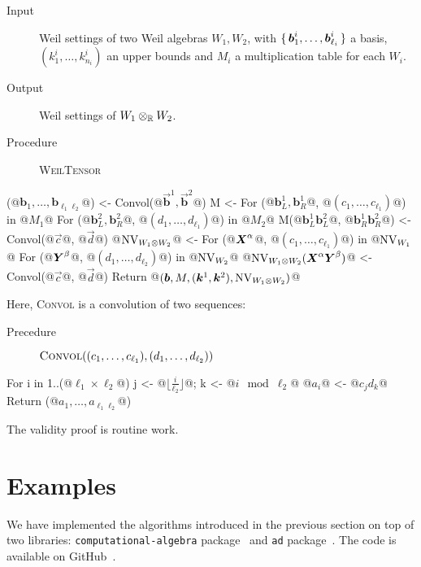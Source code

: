 \begin{algorithm}[WeilTensor]\label{alg:weil-tensor}
\hfill\vspace{-.25em}
\begin{description}
  \item[Input] Weil settings of two Weil algebras $W_1, W_2$,
  with $\set{\boldsymbol{b}_1^i, \dots, \boldsymbol{b}_{\ell_i}^i}$ a basis,
  $(k^i_1, \dots, k^i_{n_i})$ an upper bounds and $M_i$ a multiplication table for each $W_i$.
  \item[Output] Weil settings of $W_1 \otimes_{\mathbb{R}} W_2$.
  \item[Procedure] {\upshape \textsc{WeilTensor}}
\end{description}
\begin{alg}
(@$\boldsymbol{b}_1, \dots, \boldsymbol{b}_{\ell_1 \ell_2}$@) <- Convol(@$\vec{\boldsymbol{b}}^1, \vec{\boldsymbol{b}}^2$@)
M <- {}
For ({@$\boldsymbol{b}^1_L, \boldsymbol{b}^1_R$@}, @$(c_1,\dots,c_{\ell_1})$@) in @$M_1$@
  For ({@$\boldsymbol{b}^2_L, \boldsymbol{b}^2_R$@}, @$(d_1,\dots,d_{\ell_1})$@) in @$M_2$@
    M({@$\boldsymbol{b}^1_L \boldsymbol{b}^2_L$@, @$\boldsymbol{b}^1_R \boldsymbol{b}^2_R$@}) <- Convol(@$\vec{c}$@, @$\vec{d}$@)
@$\operatorname{NV}_{W_1 \otimes W_2}$@ <- {}
For (@$\boldsymbol{X}^\alpha$@, @$(c_1, \dots, c_{\ell_1})$@) in @$\operatorname{NV}_{W_1}$@
  For (@$\boldsymbol{Y}^\beta$@, @$(d_1,\dots,d_{\ell_2})$@) in @$\operatorname{NV}_{W_2}$@
    @$\operatorname{NV}_{W_1 \otimes W_2}(\boldsymbol{X}^\alpha\boldsymbol{Y}^\beta)$@ <- Convol(@$\vec{c}$@, @$\vec{d}$@)
Return @$(\boldsymbol{b}, M, (\vec{k}^1, \vec{k}^2), \NonVan_{W_1 \otimes W_2})$@
\end{alg}

Here, {\upshape \textsc{Convol}} is a convolution of two sequences:
\begin{description}
  \item[Precedure] $\mathop{\text{\upshape\scshape Convol}}((c_1, \dots, c_{\ell_1}), (d_1, \dots, d_{\ell_2}))$
\end{description}
\begin{alg}
For i in 1..(@$\ell_1 \times \ell_2$@)
  j <- @$\lfloor \frac{i}{\ell_2} \rfloor$@; k <- @$i \mod{\ell_2}$@
  @$a_i$@ <- @$c_j d_k$@
Return (@$a_1, \dots, a_{\ell_1 \ell_2}$@)
\end{alg}
\end{algorithm}

The validity proof is routine work.

\section{Examples}\label{sec:examples}
We have implemented the algorithms introduced in the previous section on top of two libraries: \texttt{computational-algebra} package~\cite{ISHII:2018ek,computational-algebra} and \texttt{ad} package~\cite{Kmett:2010aa}.
The code is available on GitHub~\cite{Ishii:2020aa}.

